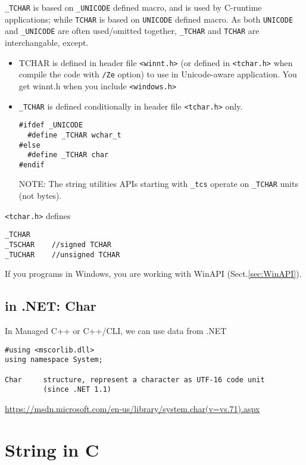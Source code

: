 \verb!_TCHAR! is based on \verb!_UNICODE! defined macro, and is
used by C-runtime applications; while \verb!TCHAR! is based on \verb!UNICODE!
defined macro. As both \verb!UNICODE! and \verb!_UNICODE! are often used/omitted
together, \verb!_TCHAR! and \verb!TCHAR! are interchangable, except. 
\begin{itemize}
  \item  TCHAR is defined in
header file \verb!<winnt.h>! (or defined in \verb!<tchar.h>! when compile the
code with \verb!/Ze! option) to use in Unicode-aware application. You get winnt.h when you
include \verb!<windows.h>!
 

  \item \verb!_TCHAR! is defined conditionally in header file \verb!<tchar.h>!
  only.
\begin{verbatim}
#ifdef _UNICODE
  #define _TCHAR wchar_t
#else
  #define _TCHAR char
#endif
\end{verbatim}

NOTE: The string utilities APIs starting with \verb!_tcs! operate on
\verb!_TCHAR! units (not bytes).
\end{itemize}

\verb!<tchar.h>! defines
\begin{verbatim}
_TCHAR
_TSCHAR    //signed TCHAR
_TUCHAR    //unsigned TCHAR
\end{verbatim}
If you programs in Windows, you are working with WinAPI
(Sect.\ref{sec:WinAPI}). 

\subsection{in .NET: Char}

In Managed C++ or C++/CLI, we can use data from .NET
\begin{verbatim}
#using <mscorlib.dll>
using namespace System;

Char     structure, represent a character as UTF-16 code unit 
         (since .NET 1.1)          
\end{verbatim}
\url{https://msdn.microsoft.com/en-us/library/system.char(v=vs.71).aspx}



\section{String in C}
\label{sec:string}
\label{sec:C_string}

